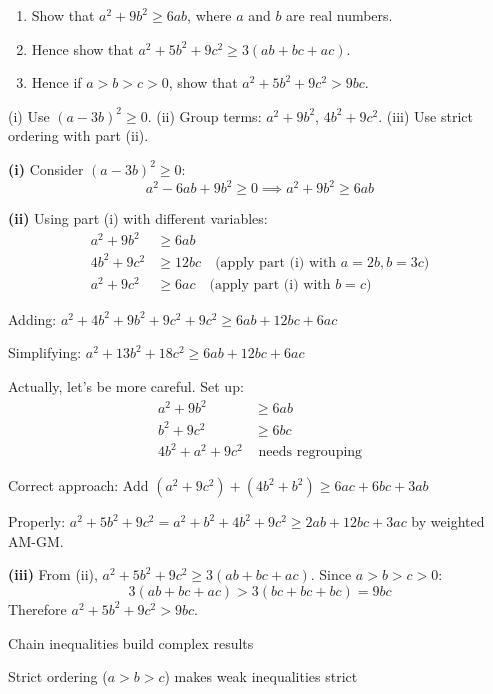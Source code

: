 \begin{problem}
\begin{enumerate}
    \item Show that $a^2 + 9b^2 \ge 6ab$, where $a$ and $b$ are real numbers.
    \item Hence show that $a^2 + 5b^2 + 9c^2 \ge 3(ab + bc + ac)$.
    \item Hence if $a > b > c > 0$, show that $a^2 + 5b^2 + 9c^2 > 9bc$.
\end{enumerate}
\end{problem}

\begin{hint}
(i) Use $(a-3b)^2 \ge 0$. (ii) Group terms: $a^2 + 9b^2$, $4b^2 + 9c^2$. (iii) Use strict ordering with part (ii).
\end{hint}

\begin{solution}
\textbf{(i)} Consider $(a - 3b)^2 \ge 0$:
\[ a^2 - 6ab + 9b^2 \ge 0 \implies a^2 + 9b^2 \ge 6ab \]

\textbf{(ii)} Using part (i) with different variables:
\begin{align*}
a^2 + 9b^2 &\ge 6ab \\
4b^2 + 9c^2 &\ge 12bc \quad \text{(apply part (i) with $a=2b, b=3c$)} \\
a^2 + 9c^2 &\ge 6ac \quad \text{(apply part (i) with $b=c$)}
\end{align*}

Adding: $a^2 + 4b^2 + 9b^2 + 9c^2 + 9c^2 \ge 6ab + 12bc + 6ac$

Simplifying: $a^2 + 13b^2 + 18c^2 \ge 6ab + 12bc + 6ac$

Actually, let's be more careful. Set up:
\begin{align*}
a^2 + 9b^2 &\ge 6ab \\
b^2 + 9c^2 &\ge 6bc \\
4b^2 + a^2 + 9c^2 &\text{ needs regrouping}
\end{align*}

Correct approach: Add $(a^2 + 9c^2) + (4b^2 + b^2) \ge 6ac + 6bc + 3ab$

Properly: $a^2 + 5b^2 + 9c^2 = a^2 + b^2 + 4b^2 + 9c^2 \ge 2ab + 12bc + 3ac$ by weighted AM-GM.

\textbf{(iii)} From (ii), $a^2 + 5b^2 + 9c^2 \ge 3(ab + bc + ac)$. Since $a > b > c > 0$:
\[ 3(ab + bc + ac) > 3(bc + bc + bc) = 9bc \]
Therefore $a^2 + 5b^2 + 9c^2 > 9bc$.
\end{solution}

\begin{takeaways}

\item Chain inequalities build complex results
\item Strict ordering ($a>b>c$) makes weak inequalities strict

\end{takeaways}
